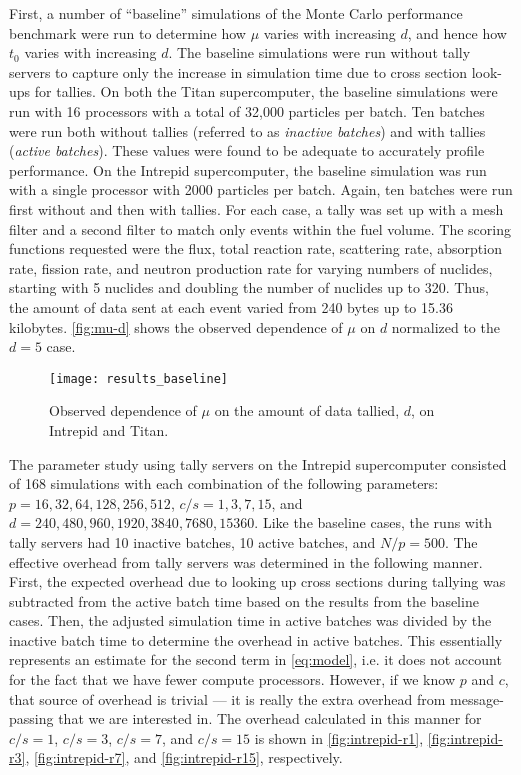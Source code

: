 \documentclass[3p,fleqn]{elsarticle}
\begin{document}
First, a number of ``baseline'' simulations of the Monte Carlo performance
benchmark were run to determine how $\mu$ varies with increasing $d$, and hence
how $t_0$ varies with increasing $d$. The baseline simulations were run without
tally servers to capture only the increase in simulation time due to cross
section look-ups for tallies. On both the Titan supercomputer, the baseline
simulations were run with 16 processors with a total of 32,000 particles per
batch. Ten batches were run both without tallies (referred to as \emph{inactive
  batches}) and with tallies (\emph{active batches}). These values were found to
be adequate to accurately profile performance. On the Intrepid supercomputer,
the baseline simulation was run with a single processor with 2000 particles per
batch. Again, ten batches were run first without and then with tallies. For each
case, a tally was set up with a mesh filter and a second filter to match only
events within the fuel volume. The scoring functions requested were the flux,
total reaction rate, scattering rate, absorption rate, fission rate, and neutron
production rate for varying numbers of nuclides, starting with 5 nuclides and
doubling the number of nuclides up to 320. Thus, the amount of data sent at each
event varied from 240 bytes up to 15.36 kilobytes. \autoref{fig:mu-d} shows the
observed dependence of $\mu$ on $d$ normalized to the $d=5$ case.

\begin{figure}
  \centering
  \texttt{[image: results\_baseline]}
  \caption{Observed dependence of $\mu$ on the amount of data tallied, $d$, on
    Intrepid and Titan.}
  \label{fig:mu-d}
\end{figure}

The parameter study using tally servers on the Intrepid supercomputer consisted
of 168 simulations with each combination of the following parameters: $p =
16,32,64,128,256,512$, $c/s = 1,3,7,15$, and $d = 240, 480, 960, \allowbreak
1920, 3840, 7680, 15360$. Like the baseline cases, the runs with tally servers
had 10 inactive batches, 10 active batches, and $N/p = 500$. The effective
overhead from tally servers was determined in the following manner. First, the
expected overhead due to looking up cross sections during tallying was
subtracted from the active batch time based on the results from the baseline
cases. Then, the adjusted simulation time in active batches was divided by the
inactive batch time to determine the overhead in active batches. This
essentially represents an estimate for the second term in \eqref{eq:model},
i.e. it does not account for the fact that we have fewer compute
processors. However, if we know $p$ and $c$, that source of overhead is trivial
--- it is really the extra overhead from message-passing that we are interested
in. The overhead calculated in this manner for $c/s = 1$, $c/s = 3$, $c/s = 7$,
and $c/s = 15$ is shown in \autoref{fig:intrepid-r1}, \autoref{fig:intrepid-r3},
\autoref{fig:intrepid-r7}, and \autoref{fig:intrepid-r15}, respectively.
\end{document}
